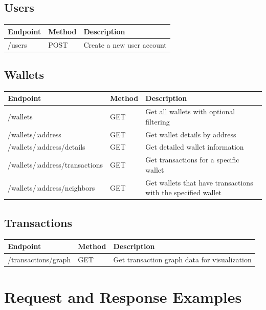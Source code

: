 \subsection*{Users}
\renewcommand{\arraystretch}{1.5}
\begin{tabular}{|p{}|p{}|p{}|}
\hline
\textbf{Endpoint} & \textbf{Method} & \textbf{Description} \\
\hline
/users & POST & Create a new user account \\
\hline
\end{tabular}

\subsection*{Wallets}
\renewcommand{\arraystretch}{1.5}
\begin{tabular}{|p{}|p{}|p{}|}
\hline
\textbf{Endpoint} & \textbf{Method} & \textbf{Description} \\
\hline
/wallets & GET & Get all wallets with optional filtering \\
\hline
/wallets/:address & GET & Get wallet details by address \\
\hline
/wallets/:address/details & GET & Get detailed wallet information \\
\hline
/wallets/:address/transactions & GET & Get transactions for a specific wallet \\
\hline
/wallets/:address/neighbors & GET & Get wallets that have transactions with the specified wallet \\
\hline
\end{tabular}

\subsection*{Transactions}
\renewcommand{\arraystretch}{1.5}
\begin{tabular}{|p{}|p{}|p{}|}
\hline
\textbf{Endpoint} & \textbf{Method} & \textbf{Description} \\
\hline
/transactions/graph & GET & Get transaction graph data for visualization \\
\hline
\end{tabular}

\section{Request and Response Examples}

